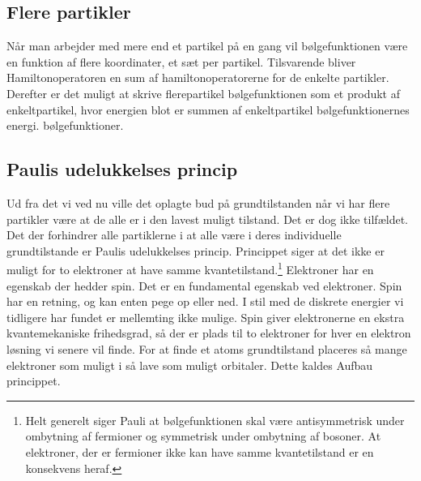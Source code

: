 \documentclass[../../Atom-ogMolekylefysik.tex]{subfiles}
\begin{document}
\subsection{Flere partikler}
Når man arbejder med mere end et partikel på en gang vil bølgefunktionen være en funktion af flere koordinater, et sæt per partikel. Tilsvarende bliver Hamiltonoperatoren en sum af hamiltonoperatorerne for de enkelte partikler.
Derefter er det muligt at skrive flerepartikel bølgefunktionen som et produkt af enkeltpartikel, hvor energien blot er summen af enkeltpartikel bølgefunktionernes energi. bølgefunktioner.

\subsection{Paulis udelukkelses princip}
Ud fra det vi ved nu ville det oplagte bud på grundtilstanden når vi har flere partikler være at de alle er i den lavest muligt tilstand. Det er dog ikke tilfældet.
Det der forhindrer alle partiklerne i at alle være i deres individuelle grundtilstande er Paulis udelukkelses princip.
Princippet siger at det ikke er muligt for to elektroner at have samme kvantetilstand.\footnote{Helt generelt siger Pauli at bølgefunktionen skal være antisymmetrisk under ombytning af fermioner og symmetrisk under ombytning af bosoner. At elektroner, der er fermioner ikke kan have samme kvantetilstand er en konsekvens heraf.}
Elektroner har en egenskab der hedder spin. Det er en fundamental egenskab ved elektroner. Spin har en retning, og kan enten pege op eller ned. I stil med de diskrete energier vi tidligere har fundet er mellemting ikke mulige.
Spin giver elektronerne en ekstra kvantemekaniske frihedsgrad, så der er plads til to elektroner for hver en elektron løsning vi senere vil finde. 
For at finde et atoms grundtilstand placeres så mange elektroner som muligt i så lave som muligt orbitaler. Dette kaldes Aufbau princippet.
\end{document}
